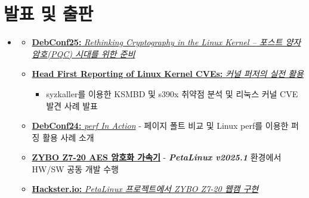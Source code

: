 \documentclass[letterpaper,11pt]{article}
\newcommand{\cvitem}[1]{
  \item\small{
    {#1\vspace{-2pt}}
  }
}
\newcommand{\cvheadingstart}{\begin{itemize}[leftmargin=0in, label={}]}
\newcommand{\cvheadingend}{\end{itemize}}
\newcommand{\cvitemstart}{\begin{itemize}[label=\textopenbullet]\justifying}
\newcommand{\cvitemend}{\end{itemize}\vspace{-5pt}}
\begin{document}
\section{발표 및 출판}
\cvheadingstart
\item
\cvitemstart

\cvitem{\href{https://youtu.be/__DURK3p218?si=aPn0f2Kixq3V4P7T}{{\textbf{DebConf25:} \textit{Rethinking Cryptography in the Linux Kernel – 포스트 양자 암호(PQC) 시대를 위한 준비}}} }

\cvitem{\href{https://youtu.be/nGxzzORZm1o?si=1k9Mz54uqYNatnO1}{\textbf{Head First Reporting of Linux Kernel CVEs:} \textit{커널 퍼저의 실전 활용}}}
\begin{itemize}
  \item syzkaller를 이용한 KSMBD 및 s390x 취약점 분석 및 리눅스 커널 CVE 발견 사례 발표
\end{itemize}

  \cvitem{\href{https://youtu.be/RRJN8JS5xAE?si=_X-7-OyXzPrcyGes}{{\textbf{DebConf24:}} \textit{perf In Action}} - 페이지 폴트 비교 및 Linux perf를 이용한 퍼징 활용 사례 소개}

  \cvitem{\textbf{\href{https://www.linkedin.com/posts/yunseong-kim-linux-kernel_xilinx-fpga-linux-activity-7341153544160362496-_sBg?utm_source=share&utm_medium=member_desktop&rcm=ACoAADZ7vgEBrd70u0-SnyUUHL-swTgyhcvNQGE}{ZYBO Z7-20 AES 암호화 가속기}} - \textit{\textbf{PetaLinux v2025.1}} 환경에서 HW/SW 공동 개발 수행}

  \cvitem{\href{https://www.hackster.io/p4ranlee/zybo-z7-20-webcam-on-the-petalinux-c28709}{{\textbf{Hackster.io:}} \textit{PetaLinux 프로젝트에서 ZYBO Z7-20 웹캠 구현}}}
  
\cvitemend
\cvheadingend
\end{document}
